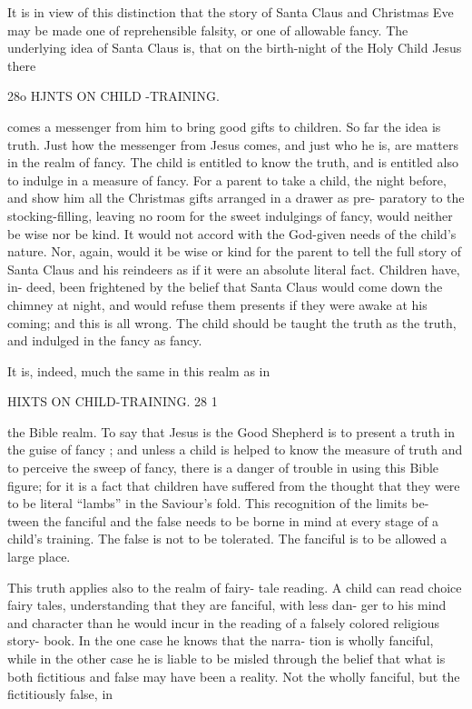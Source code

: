 \documentclass[
]{book}
\begin{document}
It is in view of this distinction that the story of Santa Claus and Christmas Eve may be made one of reprehensible falsity, or one of allowable fancy. The underlying idea of Santa Claus is, that on the birth-night of the Holy Child Jesus there

28o HJNTS ON CHILD -TRAINING.

comes a messenger from him to bring good gifts to children. So far the idea is truth. Just how the messenger from Jesus comes, and just who he is, are matters in the realm of fancy. The child is entitled to know the truth, and is entitled also to indulge in a measure of fancy. For a parent to take a child, the night before, and show him all the Christmas gifts arranged in a drawer as pre- paratory to the stocking-filling, leaving no room for the sweet indulgings of fancy, would neither be wise nor be kind. It would not accord with the God-given needs of the child's nature. Nor, again, would it be wise or kind for the parent to tell the full story of Santa Claus and his reindeers as if it were an absolute literal fact. Children have, in- deed, been frightened by the belief that Santa Claus would come down the chimney at night, and would refuse them presents if they were awake at his coming; and this is all wrong. The child should be taught the truth as the truth, and indulged in the fancy as fancy.

It is, indeed, much the same in this realm as in

HIXTS ON CHILD-TRAINING. 28 1

the Bible realm. To say that Jesus is the Good Shepherd is to present a truth in the guise of fancy ; and unless a child is helped to know the measure of truth and to perceive the sweep of fancy, there is a danger of trouble in using this Bible figure; for it is a fact that children have suffered from the thought that they were to be literal ``lambs'' in the Saviour's fold. This recognition of the limits be- tween the fanciful and the false needs to be borne in mind at every stage of a child's training. The false is not to be tolerated. The fanciful is to be allowed a large place.

This truth applies also to the realm of fairy- tale reading. A child can read choice fairy tales, understanding that they are fanciful, with less dan- ger to his mind and character than he would incur in the reading of a falsely colored religious story- book. In the one case he knows that the narra- tion is wholly fanciful, while in the other case he is liable to be misled through the belief that what is both fictitious and false may have been a reality. Not the wholly fanciful, but the fictitiously false, in
\end{document}
